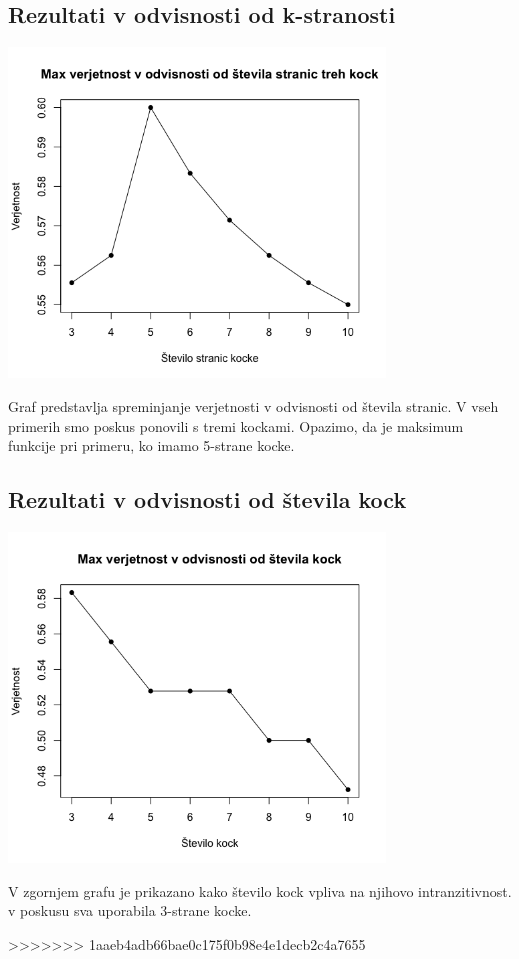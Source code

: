 \documentclass[12pt,a4paper]{amsart}
\begin{document}
 \subsection{Rezultati v odvisnosti od k-stranosti}
 \begin{center}
    \includegraphics*[width=100mm]{st_stranic.png}
 \end{center}
 Graf predstavlja spreminjanje verjetnosti v odvisnosti od števila stranic. V vseh primerih smo poskus ponovili s tremi kockami. Opazimo, da je maksimum funkcije pri primeru, ko imamo 5-strane kocke.
 \subsection{Rezultati v odvisnosti od števila kock}
\begin{center}
    \includegraphics*[width=100mm]{st_kock.png}
\end{center}
V zgornjem grafu je prikazano kako število kock vpliva na njihovo intranzitivnost. v poskusu sva uporabila 3-strane kocke.





>>>>>>> 1aaeb4adb66bae0c175f0b98e4e1decb2c4a7655
\end{document}
